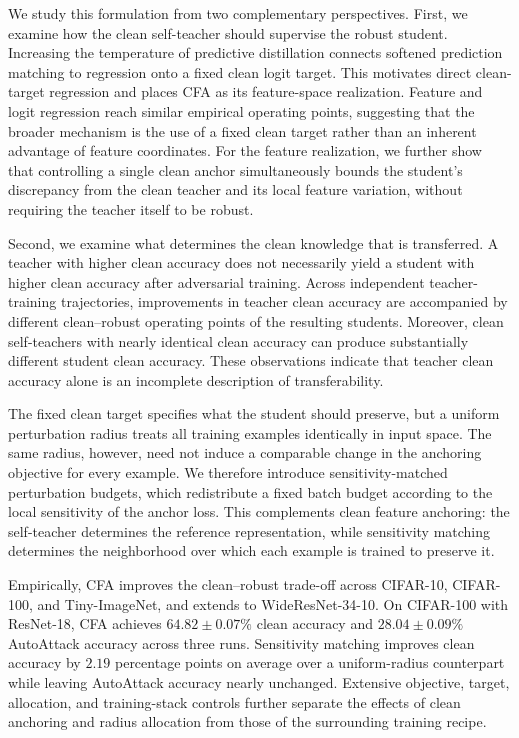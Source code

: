 \documentclass{article} %
\theoremstyle{plain}
\begin{document}
We study this formulation from two complementary perspectives.
First, we examine how the clean self-teacher should supervise the robust
student.
Increasing the temperature of predictive distillation connects softened
prediction matching to regression onto a fixed clean logit target.
This motivates direct clean-target regression and places CFA as its
feature-space realization.
Feature and logit regression reach similar empirical operating points,
suggesting that the broader mechanism is the use of a fixed clean target
rather than an inherent advantage of feature coordinates.
For the feature realization, we further show that controlling a single
clean anchor simultaneously bounds the student's discrepancy from the clean
teacher and its local feature variation, without requiring the teacher itself
to be robust.

Second, we examine what determines the clean knowledge that is transferred.
A teacher with higher clean accuracy does not necessarily yield a student
with higher clean accuracy after adversarial training.
Across independent teacher-training trajectories, improvements in teacher
clean accuracy are accompanied by different clean--robust operating points
of the resulting students.
Moreover, clean self-teachers with nearly identical clean accuracy can
produce substantially different student clean accuracy.
These observations indicate that teacher clean accuracy alone is an
incomplete description of transferability.

The fixed clean target specifies what the student should preserve, but a
uniform perturbation radius treats all training examples identically in input
space.
The same radius, however, need not induce a comparable change in the
anchoring objective for every example.
We therefore introduce sensitivity-matched perturbation budgets, which
redistribute a fixed batch budget according to the local sensitivity of the
anchor loss.
This complements clean feature anchoring: the self-teacher determines the
reference representation, while sensitivity matching determines the
neighborhood over which each example is trained to preserve it.

Empirically, CFA improves the clean--robust trade-off across CIFAR-10,
CIFAR-100, and Tiny-ImageNet, and extends to WideResNet-34-10.
On CIFAR-100 with ResNet-18, CFA achieves
\(64.82\mathbin{\pm}0.07\%\) clean accuracy and
\(28.04\mathbin{\pm}0.09\%\) AutoAttack accuracy across three runs.
Sensitivity matching improves clean accuracy by \(2.19\) percentage points
on average over a uniform-radius counterpart while leaving AutoAttack
accuracy nearly unchanged.
Extensive objective, target, allocation, and training-stack controls further
separate the effects of clean anchoring and radius allocation from those of
the surrounding training recipe.
\end{document}
